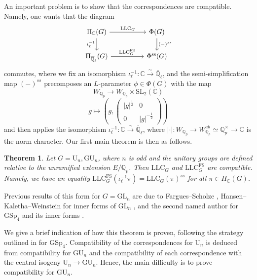 \documentclass[reqno,11pt]{amsart}
\newtheorem{theorem}{Theorem}[section]
\theoremstyle{remark}
\newcommand{\GU}{\mathrm{GU}}
\newcommand{\U}{\mathrm{U}}
\newcommand{\C}{\mathbb{C}}
\newcommand{\GL}{\mathrm{GL}}
\newcommand{\Q}{\mathbb{Q}}
\newcommand{\ov}{\overline}
\newcommand{\SL}{\mathrm{SL}}
\newcommand{\LLC}{\mathrm{LLC}}
\newcommand{\FS}{\mathrm{FS}}
\def\ra{\rightarrow}
\begin{document}
An important problem is to show that the correspondences are compatible. Namely, one wants that the diagram
\begin{equation*}
\begin{tikzcd}[ampersand replacement=\&]
            \Pi_{\C}(G)  \ar[rr, "\LLC_{G}"] \arrow[d, swap, "\iota^{-1}_{\ell}"] \& \&   \Phi(G) \ar[d,"(-)^{ss}"] \\
            \Pi_{\ov{\Q}_{\ell}}(G) \arrow[rr, "\LLC^{\FS}_G"]\& \& \Phi^{\mathrm{ss}}(G)
        \end{tikzcd}
\end{equation*} 
commutes, where we fix an isomorphism $\iota_{\ell}^{-1}: \mathbb{C} \xrightarrow{\sim} \overline{\mathbb{Q}}_{\ell}$, and the semi-simplification map $(-)^{ss}$ precomposes an $L$-parameter $\phi \in \Phi(G)$ with the map  
\[ W_{\mathbb{Q}_{p}} \ra W_{\mathbb{Q}_{p}} \times \SL_{2}(\mathbb{C}) \]
\[g  \mapsto (g,\begin{pmatrix}
|g|^{\frac{1}{2}} & 0 \\
0 & |g|^{-\frac{1}{2}}  
\end{pmatrix}) \]  
and then applies the isomorphism $\iota_{\ell}^{-1}: \mathbb{C} \xrightarrow{\sim} \overline{\mathbb{Q}}_{\ell}$, where $|\cdot|: W_{\mathbb{Q}_{p}} \rightarrow W_{\mathbb{Q}_{p}}^{ab} \simeq \mathbb{Q}_{p}^{\times} \rightarrow \mathbb{C}$ is the norm character. Our first main theorem is then as follows.
\begin{theorem}{\label{thm: introcompatibility}}
Let $G = \U_n, \GU_n$, where $n$ is odd and the unitary groups are defined relative to the unramified extension $E/\Q_p$. Then $\LLC_G$ and $\LLC^{\mathrm{FS}}_G$ are compatible. Namely, we have an equality $\LLC^{\mathrm{FS}}_G(\iota^{-1}_{\ell}\pi) = \LLC_G(\pi)^{ss}$ for all $\pi \in \Pi_{\C}(G)$.
\end{theorem}
Previous results of this form for $G = \GL_{n}$ are due to Fargues--Scholze \cite[Section~IX.7.3]{FS}, Hansen--Kaletha--Weinstein for inner forms of $\GL_{n}$ \cite[Theorem~1.0.3]{HKW}, and the second named author for $\mathrm{GSp}_{4}$ and its inner forms \cite[Theorem~1.1]{Ham}. 

We give a brief indication of how this theorem is proven, following the strategy outlined in \cite{Ham} for $\mathrm{GSp}_{4}$. Compatibility of the correspondences for $\U_n$ is deduced from compatibility for $\GU_n$ and the compatibility of each correspondence with the central isogeny $\U_n \to \GU_n$. Hence, the main difficulty is to prove compatibility for $\GU_n$.
\end{document}
